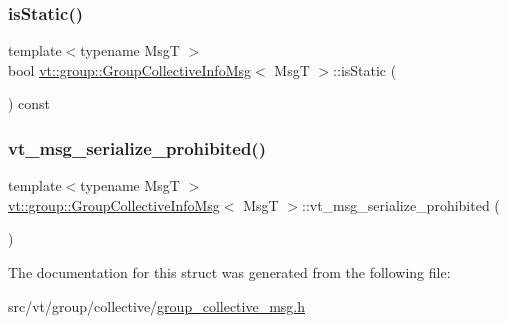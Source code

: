 \subsubsection{\texorpdfstring{is\+Static()}{isStatic()}}
{\footnotesize\ttfamily template$<$typename MsgT $>$ \\
bool \hyperlink{structvt_1_1group_1_1_group_collective_info_msg}{vt\+::group\+::\+Group\+Collective\+Info\+Msg}$<$ MsgT $>$\+::is\+Static (\begin{DoxyParamCaption}{ }\end{DoxyParamCaption}) const\hspace{0.3cm}{\ttfamily [inline]}}

\mbox{\label{structvt_1_1group_1_1_group_collective_info_msg_a0738015d12a55f4f95a4bdf328efb6b6}} 
\subsubsection{\texorpdfstring{vt\+\_\+msg\+\_\+serialize\+\_\+prohibited()}{vt\_msg\_serialize\_prohibited()}}
{\footnotesize\ttfamily template$<$typename MsgT $>$ \\
\hyperlink{structvt_1_1group_1_1_group_collective_info_msg}{vt\+::group\+::\+Group\+Collective\+Info\+Msg}$<$ MsgT $>$\+::vt\+\_\+msg\+\_\+serialize\+\_\+prohibited (\begin{DoxyParamCaption}{ }\end{DoxyParamCaption})}



The documentation for this struct was generated from the following file\+:\begin{DoxyCompactItemize}
\item 
src/vt/group/collective/\hyperlink{group__collective__msg_8h}{group\+\_\+collective\+\_\+msg.\+h}\end{DoxyCompactItemize}
